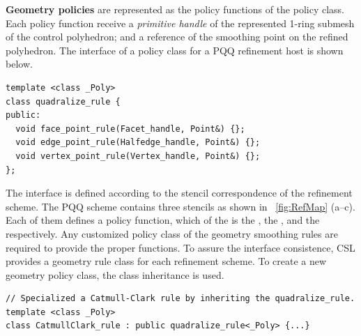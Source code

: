 \noindent \textbf{Geometry policies} are represented as
the policy functions of the policy class. Each policy function
receive a \emph{primitive handle} of the represented 1-ring submesh 
of the control polyhedron; and a reference of the smoothing point
on the refined polyhedron. The interface of a policy class for a PQQ
refinement host is shown below.
\begin{lstlisting}
template <class _Poly>
class quadralize_rule {
public:
  void face_point_rule(Facet_handle, Point&) {};
  void edge_point_rule(Halfedge_handle, Point&) {};
  void vertex_point_rule(Vertex_handle, Point&) {};
};
\end{lstlisting}
The interface is defined according to
the stencil correspondence of the refinement scheme. 
The PQQ scheme contains three stencils as shown in
\figurename\ \ref{fig:RefMap} (a--c). Each of them
defines a policy function, which of the  
is the , 
the , and the  
respectively. Any customized policy class of the geometry 
smoothing rules are required to provide the proper functions.
To assure the interface consistence, CSL provides
a geometry rule class for each refinement scheme. To create a new
geometry policy class, the class inheritance is used.
\begin{lstlisting}
// Specialized a Catmull-Clark rule by inheriting the quadralize_rule.
template <class _Poly>
class CatmullClark_rule : public quadralize_rule<_Poly> {...}
\end{lstlisting}

